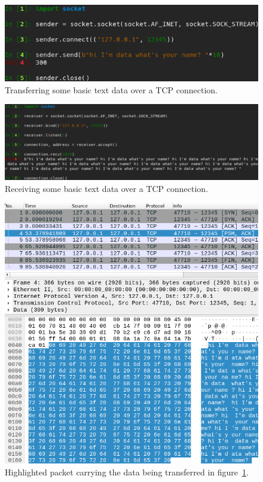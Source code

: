 \documentclass[titlepage]{article}
\begin{document}
\begin{figure}[H]
  \centering
  \includegraphics[width=\textwidth]{screenshots/sender.png}
  \caption{%
    Transferring some basic text data over a TCP connection.
  }\label{sender}
\end{figure}

\begin{figure}[H]
  \centering
  \includegraphics[width=\textwidth]{screenshots/receiver.png}
  \caption{%
    Receiving some basic text data over a TCP connection.
  }\label{receiver}
\end{figure}

\begin{figure}[H]
  \centering
  \includegraphics[width=\textwidth]{screenshots/data.png}
  \caption{%
    Highlighted packet carrying the data being transferred in figure~\ref{sender}.
  }\label{data}
\end{figure}
\end{document}
